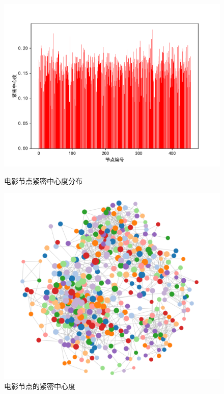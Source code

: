 \documentclass[UTF8, onecolumn, a4paper]{article}
\begin{document}
\begin{center}
	\begin{figure}[ht] %
		\centering %
		\begin{minipage}[b]{0.95\linewidth} %
			\begin{minipage}[b]{0.47\linewidth} %
				\centering
				\includegraphics[width=\linewidth]{../pictures/movie_closeness}
				\caption{电影节点紧密中心度分布}
			\end{minipage}
			\hfill
			\begin{minipage}[b]{0.46\linewidth}
				\centering
				\includegraphics[width=\linewidth]{../pictures/show12}
				\caption{电影节点的紧密中心度}
			\end{minipage}
		\end{minipage}
	\end{figure}
\end{center}
\end{document}

